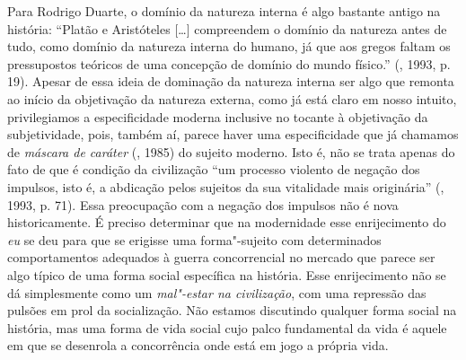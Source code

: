 Para Rodrigo Duarte, o domínio da natureza interna é algo bastante
antigo na história: ``Platão e Aristóteles [\ldots{}] compreendem o
domínio da natureza antes de tudo, como domínio da natureza interna do
humano, já que aos gregos faltam os pressupostos teóricos de uma
concepção de domínio do mundo físico.'' (, 1993, p. 19). Apesar de
essa ideia de dominação da natureza interna ser algo que remonta ao
início da objetivação da natureza externa, como já está claro em nosso
intuito, privilegiamos a especificidade moderna inclusive no tocante à
objetivação da subjetividade, pois, também aí, parece haver uma
especificidade que já chamamos de \emph{máscara de caráter} (, 1985)
do sujeito moderno. Isto é, não se trata apenas do fato de que é
condição da civilização ``um processo violento de negação dos impulsos,
isto é, a abdicação pelos sujeitos da sua vitalidade mais originária''
(, 1993, p. 71). Essa preocupação com a negação dos impulsos não
é nova historicamente. É preciso determinar que na modernidade esse
enrijecimento do \emph{eu} se deu para que se erigisse uma forma"-sujeito
com determinados comportamentos adequados à guerra concorrencial no
mercado que parece ser algo típico de uma forma social específica na
história. Esse enrijecimento não se dá simplesmente como um
\emph{mal"-estar na civilização}, com uma repressão das pulsões em prol
da socialização. Não estamos discutindo qualquer forma social na
história, mas uma forma de vida social cujo palco fundamental da vida é
aquele em que se desenrola a concorrência onde está em jogo a própria
vida.


